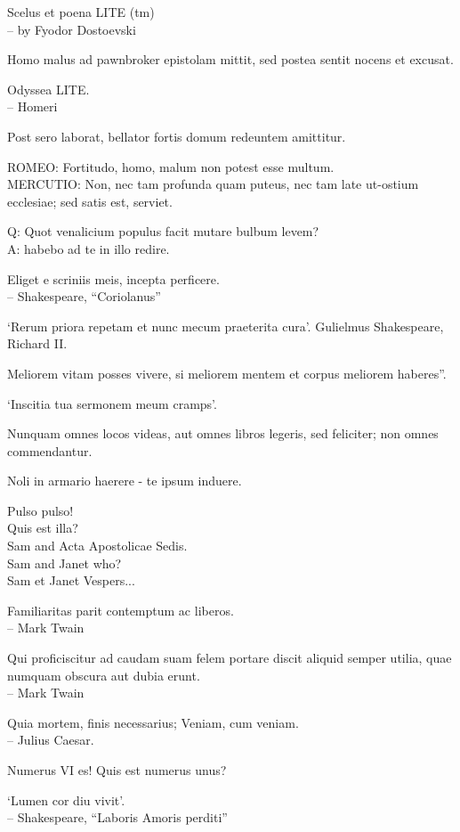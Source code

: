 \documentclass[titlepage,12pt]{memoir}
\begin{document}
Scelus et poena LITE (tm)
\\-- by Fyodor Dostoevski

Homo malus ad pawnbroker epistolam mittit, sed postea
sentit nocens et excusat.

Odyssea LITE.
\\-- Homeri

Post sero laborat, bellator fortis domum redeuntem amittitur.

ROMEO: Fortitudo, homo, malum non potest esse multum.\\
MERCUTIO: Non, nec tam profunda quam puteus, nec tam late
ut-ostium ecclesiae; sed satis est, serviet.

Q: Quot venalicium populus facit mutare bulbum levem?\\
A: habebo ad te in illo redire.

Eliget e scriniis meis, incepta perficere.
\\-- Shakespeare, “Coriolanus”

‘Rerum priora repetam et nunc mecum praeterita cura’.
Gulielmus Shakespeare, Richard II.

Meliorem vitam posses vivere, si meliorem mentem et corpus meliorem haberes”.

‘Inscitia tua sermonem meum cramps’.

Nunquam omnes locos videas, aut omnes libros legeris, sed feliciter;
non omnes commendantur.

Noli in armario haerere - te ipsum induere.

Pulso pulso!\\
Quis est illa?\\
Sam and Acta Apostolicae Sedis.\\
Sam and Janet who?\\
Sam et Janet Vespers...

 Familiaritas parit contemptum ac liberos.
\\-- Mark Twain

Qui proficiscitur ad caudam suam felem portare discit aliquid
semper utilia, quae numquam obscura aut dubia erunt.
\\-- Mark Twain

Quia mortem, finis necessarius;
Veniam, cum veniam.
\\-- Julius Caesar.

Numerus VI es! Quis est numerus unus?

‘Lumen cor diu vivit’.
\\-- Shakespeare, “Laboris Amoris perditi”
\end{document}
